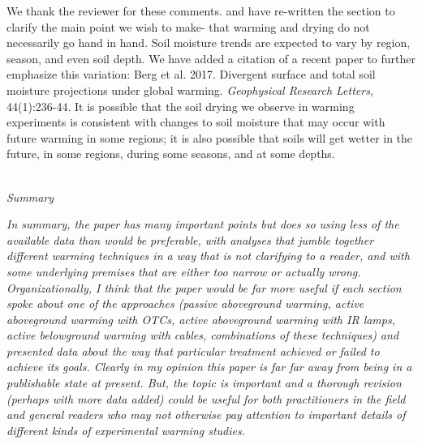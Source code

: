 \documentclass[11pt,a4paper]{letter}
\begin{document}
\par We thank the reviewer for these comments. and have re-written the section to clarify the main point we wish to make- that warming and drying do not necessarily go hand in hand. Soil moisture trends are expected to vary by region, season, and even soil depth. We have added a citation of a recent paper to further emphasize this variation: Berg et al. 2017. Divergent surface and total soil moisture projections under global warming. \emph{Geophysical Research Letters}, 44(1):236-44. It is possible that the soil drying we observe in warming experiments is consistent with changes to soil moisture that may occur with future warming in some regions; it is also possible that soils will get wetter in the future, in some regions, during some seasons, and at some depths. 

\\
\emph{Summary}

\emph{In summary, the paper has many important points but does so using less of the available data
than would be preferable, with analyses that jumble together different warming techniques in a
way that is not clarifying to a reader, and with some underlying premises that are either too
narrow or actually wrong. Organizationally, I think that the paper would be far more useful if
each section spoke about one of the approaches (passive aboveground warming, active
aboveground warming with OTCs, active aboveground warming with IR lamps, active
belowground warming with cables, combinations of these techniques) and presented data
about the way that particular treatment achieved or failed to achieve its goals. Clearly in my
opinion this paper is far far away from being in a publishable state at present. But, the topic is
important and a thorough revision (perhaps with more data added) could be useful for both
practitioners in the field and general readers who may not otherwise pay attention to
important details of different kinds of experimental warming studies.}
\end{document}
